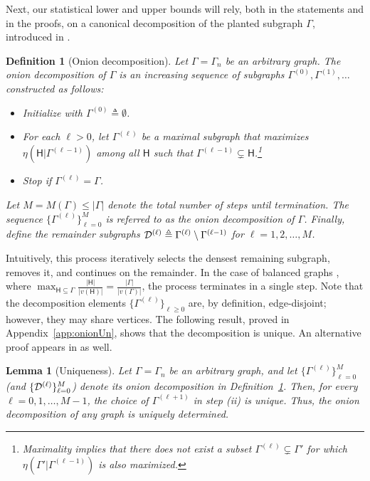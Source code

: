 \documentclass[12pt]{article}
\newtheorem{definition}{Definition}
\newtheorem{lemma}{Lemma}
\newcommand{\calD}{{\cal D}}
\newcommand{\s}[1]{\mathsf{#1}}
\begin{document}
Next, our statistical lower and upper bounds will rely, both in the statements and in the proofs, on a canonical decomposition of the planted subgraph $\Gamma$, introduced in \cite[Definition~3.3]{LeePerniceRajaramanZadik2025}.
\begin{definition}[Onion decomposition]\label{def:onionDec}
Let $\Gamma = \Gamma_n$ be an arbitrary graph. The \emph{onion decomposition} of $\Gamma$ is an increasing sequence of subgraphs $\Gamma^{(0)},\Gamma^{(1)},\dots$ constructed as follows:
\begin{itemize}
    \item[(i)] Initialize with $\Gamma^{(0)}\triangleq\emptyset$.
    \item[(ii)] For each $\ell> 0$, let $\Gamma^{(\ell)}$ be a maximal subgraph that maximizes $\eta(\s{H} \vert \Gamma^{(\ell-1)})$ among all $\s{H}$ such that $ \Gamma^{(\ell-1)}\subsetneq \s{H}$.\footnote{Maximality implies that there does not exist a subset $\Gamma^{(\ell)}\subsetneq\Gamma'$ for which $\eta(\Gamma' \vert \Gamma^{(\ell-1)})$ is also maximized.}
    \item[(iii)] Stop if $\Gamma^{(\ell)} = \Gamma$.
\end{itemize}
Let $M = M(\Gamma) \leq |\Gamma|$ denote the total number of steps until termination. The sequence $\{ \Gamma^{(\ell)} \}_{\ell=0}^M$ is referred to as the onion decomposition of $\Gamma$. Finally, define the remainder subgraphs $\calD^{(\ell)}\triangleq\Gamma^{(\ell)}\setminus\Gamma^{(\ell-1)}$ for $\ell=1,2,\ldots,M$.
\end{definition}
Intuitively, this process iteratively selects the densest remaining subgraph, removes it, and continues on the remainder. In the case of balanced graphs \cite{bollobas_1981}, where $\max_{\s{H} \subseteq \Gamma} \frac{|\s{H}|}{|v(\s{H})|} = \frac{|\Gamma|}{|v(\Gamma)|}$, the process terminates in a single step. Note that the decomposition elements $\{\Gamma^{(\ell)}\}_{\ell\geq0}$ are, by definition, edge-disjoint; however, they may share vertices. The following result, proved in Appendix~\ref{app:onionUn}, shows that the decomposition is unique. An alternative proof appears in \cite[Thm.~3.6]{LeePerniceRajaramanZadik2025} as well.
\begin{lemma}[Uniqueness]\label{lem:onionUnique}
Let $\Gamma = \Gamma_n$ be an arbitrary graph, and let $\{ \Gamma^{(\ell)} \}_{\ell=0}^{M}$ (and $\{ \calD^{(\ell)} \}_{\ell=0}^{M}$) denote its onion decomposition in Definition~\ref{def:onionDec}. Then, for every $\ell = 0, 1, \dots, M-1$, the choice of $\Gamma^{(\ell+1)}$ in step (ii) is unique. Thus, the onion decomposition of any graph is uniquely determined.
\end{lemma}
\end{document}
